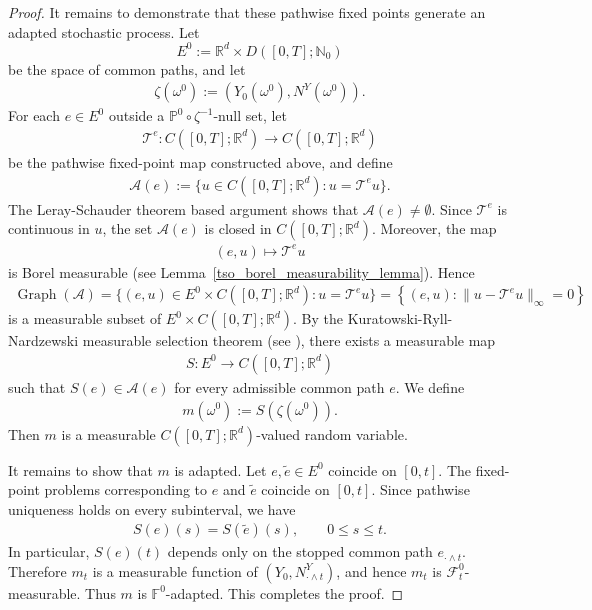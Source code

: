 \documentclass{article}
\def\R{\mathbb{R}}
\numberwithin{equation}{section}
\begin{document}
\begin{proof}
It remains to demonstrate that these pathwise fixed points generate an adapted stochastic process. 
Let
\begin{equation*}
    E^0:=\R^d\times D([0,T];\mathbb N_0)
\end{equation*}
be the space of common paths, and let
\begin{align*}
    \zeta(\omega^0):=(Y_0(\omega^0),N^Y(\omega^0)).
\end{align*}
For each $e\in E^0$ outside a $\mathbb P^0\circ\zeta^{-1}$-null set, let
\begin{align*}
    \mathcal T^e:C([0,T];\R^d)\to C([0,T];\R^d)
\end{align*}
be the pathwise fixed-point map constructed above, and define
\begin{align*}
    \mathcal A(e):=
    \{u\in C([0,T];\mathbb R^d):u=\mathcal T^e u\}.
\end{align*}
The Leray-Schauder theorem based argument shows that $\mathcal A(e)\neq\emptyset$. Since
$\mathcal T^e$ is continuous in $u$, the set $\mathcal A(e)$ is closed in
$C([0,T];\mathbb R^d)$. Moreover, the map
\begin{align*}
    (e,u)\mapsto \mathcal T^e u
\end{align*}
is Borel measurable (see Lemma~\ref{tso_borel_measurability_lemma}). Hence
\begin{align*}
    \operatorname{Graph}(\mathcal A)= \{(e,u) \in E^0 \times C([0,T]; \R^d) :u=\mathcal T^e u\}
    =
    \left\{(e,u):\|u-\mathcal T^e u\|_\infty=0\right\}
\end{align*}
is a measurable subset of
$E^0\times C([0,T];\mathbb R^d)$. By the
Kuratowski-Ryll-Nardzewski measurable selection theorem (see \cite[Section~5.2]{srivastava1998course}), there exists a
measurable map
\begin{align*}
    S:E^0\to C([0,T];\mathbb R^d)
\end{align*}
such that $S(e)\in\mathcal A(e)$ for every admissible common path $e$. We define
\begin{align*}
    m(\omega^0):=S(\zeta(\omega^0)).
\end{align*}
Then $m$ is a measurable $C([0,T];\mathbb R^d)$-valued random variable. 

It remains to show that $m$ is adapted. Let $e,\tilde e\in E^0$ coincide on
$[0,t]$. The fixed-point problems
corresponding to $e$ and $\tilde e$ coincide on $[0,t]$. Since pathwise
uniqueness holds on every subinterval, we have
\begin{align}
    S(e)(s)=S(\tilde e)(s),
    \qquad 0\le s\le t.
\end{align}
In particular, $S(e)(t)$ depends only on the stopped common path
$e_{\cdot\wedge t}$. Therefore $m_t$ is a measurable function of
$(Y_0,N^Y_{\cdot\wedge t})$, and hence $m_t$ is $\mathcal F_t^0$-measurable.
Thus $m$ is $\mathbb F^0$-adapted. This completes the proof.

\end{proof}
\end{document}

